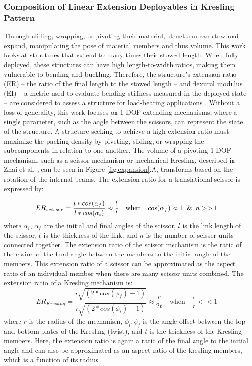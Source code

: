 \subsubsection{Composition of Linear Extension Deployables in Kresling Pattern} Through sliding, wrapping, or pivoting their material, structures can stow and expand, manipulating the pose of material members and thus volume. This work looks at structures that extend to many times their stowed length. When fully deployed, these structures can have high length-to-width ratios, making them vulnerable to bending and buckling. Therefore, the structure's extension ratio (ER) -- the ratio of the final length to the stowed length -- and flexural modulus (EI) -- a metric used to evaluate bending stiffness measured in the deployed state -- are considered to assess a structure for load-bearing applications \cite{mikulas_truss_2006}. Without a loss of generality, this work focuses on 1-DOF extending mechanisms, where a single parameter, such as the angle between the scissors, can represent the state of the structure. A structure seeking to achieve a high extension ratio must maximize the packing density by pivoting, sliding, or wrapping the subcomponents in relation to one another. The volume of a pivoting 1-DOF mechanism, such as a scissor mechanism or mechanical Kresling, described in Zhai et al. \cite{zhai_origami-inspired_2018}, can be seen in Figure \ref{fig:expansion}.A, transforms based on the rotation of the internal beams. The extension ratio for a translational scissor is expressed by:

\begin{equation}
    ER_{scissor} = \frac{l*cos(\alpha_f)}{l*cos(\alpha_i)} \approx \frac{l}{t} \quad \text{when}\quad cos(\alpha_f) \approx 1 \And n >> 1
\end{equation}
where $\alpha_i$, $\alpha_f$ are the initial and final angles of the scissor, $l$ is the link length of the scissor, $t$ is the thickness of the link, and $n$ is the number of scissor units connected together. The extension ratio of the scissor mechanism is the ratio of the cosine of the final angle between the members to the initial angle of the members. This extension ratio of a scissor can be approximated as the aspect ratio of an individual member when there are many scissor units combined. The extension ratio of a Kresling mechanism is:
\begin{equation}
    ER_{Kresling} = \frac{r\sqrt{(2*cos(\phi_f)-1)}}{r\sqrt{(2*cos(\phi_i)-1)}} \approx \frac{r}{2t} \quad \text{when}\quad \frac{t}{r} << 1
\end{equation}
where $r$ is the radius of the mechanism, $\phi_i, \phi_f$ is the angle offset between the top and bottom plates of the Kresling (twist), and $t$ is the thickness of the Kresling members. Here, the extension ratio is again a ratio of the final angle to the initial angle and can also be approximated as an aspect ratio of the kresling members, which is a function of its radius. 


